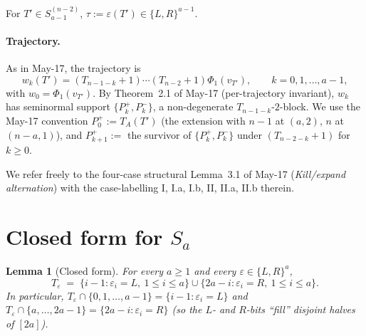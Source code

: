 \documentclass[11pt]{article}
\newtheorem{lemma}[theorem]{Lemma}
\theoremstyle{definition}
\begin{document}
For $T'\in S_{a-1}^{(n-2)}$, $\tau:=\varepsilon(T')\in\{L,R\}^{a-1}$.

\paragraph{Trajectory.}  As in May-17, the trajectory is
\[
   w_k(T')=(T_{n-1-k}{+}1)\cdots(T_{n-2}{+}1)\Phi_1(v_{T'}),
   \qquad k=0,1,\ldots,a-1,
\]
with $w_0=\Phi_1(v_{T'})$.  By Theorem~2.1 of May-17 (per-trajectory
invariant), $w_k$ has seminormal support $\{P_k^+,P_k^-\}$, a
non-degenerate $T_{n-1-k}$-$2$-block.  We use the May-17 convention
$P_0^+:=T_A(T')$ (the extension with $n-1$ at $(a,2)$, $n$ at
$(n-a,1)$), and $P_{k+1}^+:=$ the survivor of
$\{P_k^+,P_k^-\}$ under $(T_{n-2-k}{+}1)$ for $k\ge 0$.

We refer freely to the four-case structural Lemma~3.1 of May-17
(\emph{Kill/expand alternation}) with the case-labelling I, I.a, I.b,
II, II.a, II.b therein.

\section{Closed form for $S_a$}\label{sec:closed-form}

\begin{lemma}[Closed form]\label{lem:closed-form}
For every $a\ge 1$ and every $\varepsilon\in\{L,R\}^a$,
\[
   T_\varepsilon\;=\;
   \{i-1 : \varepsilon_i=L,\ 1\le i\le a\}
   \cup
   \{2a-i : \varepsilon_i=R,\ 1\le i\le a\}.
\]
In particular, $T_\varepsilon\cap\{0,1,\ldots,a-1\}=
\{i-1 : \varepsilon_i=L\}$ and
$T_\varepsilon\cap\{a,\ldots,2a-1\}=\{2a-i : \varepsilon_i=R\}$
(so the $L$- and $R$-bits ``fill'' disjoint halves of $[2a]$).
\end{lemma}
\end{document}
